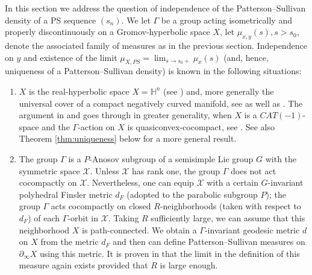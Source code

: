 \documentclass[12pt]{amsbook}%
\theoremstyle{definition}
\theoremstyle{remark}
\numberwithin{section}{chapter}
\numberwithin{subsection}{section}
\numberwithin{figure}{chapter}
\def\bH{{\mathbb{H}}}
\def\cX{{\mathscr{X}}}
\def\Ga{\Gamma}
\def\geo{\partial_\infty}
\begin{document}
{{In this section we address the question of independence of the Patterson--Sullivan density  of a PS sequence $(s_n)$. 
We let $\Ga$ be a group acting isometrically and properly discontinuously on a Gromov-hyperbolic space $X$, let $\mu_{x,y}(s), s>s_0$, 
denote the associated family of measures as in the previous section. Independence on $y$ and 
existence of the limit $\mu_{X,PS}=\lim_{s\to s_0+} \mu_{x}(s)$ (and, hence, uniqueness of a Patterson--Sullivan density) 
is known in the following situations:

\begin{enumerate}

\item $X$ is the real-hyperbolic space $X=\bH^n$ (see \cite{nicholls}) and, more generally  the  universal cover of a compact negatively curved manifold, see \cite{Yue} as well as \cite{quint_note}. The argument in \cite{Yue} and \cite{quint_note} goes through in greater generality, when $X$ is a $CAT(-1)$-space and the $\Ga$-action on $X$ is quasiconvex-cocom\-pact, see \cite[Corollary 1.8]{Roblin}. See also Theorem \ref{thm:uniqueness} below for a more general result. 



\item The group $\Ga$ is a $P$-Anosov subgroup of a semisimple Lie group $G$ with the symmetric space $\cX$. Unless $\cX$ has rank one, the group $\Ga$ does not act cocompactly on $\cX$. Nevertheless, one can equip $\cX$ with a certain $G$-invariant polyhedral Finsler metric $d_F$ (adopted to the parabolic subgroup $P$); the group $\Ga$ acts cocompactly on closed $R$-neighborhoods (taken with respect to $d_F$) of each $\Ga$-orbit in $\cX$.  Taking $R$ sufficiently large, we can assume that this neighborhood $X$ is path-connected. We obtain a $\Ga$-invariant geodesic metric $d$ on $X$ from the metric $d_F$ and then can define Patterson--Sullivan measures on $\geo X$ using this metric. It is proven in \cite{Dey-Kapovich} that the limit in the definition of this measure again exists provided that $R$ is large enough. 



\end{enumerate}}}
\end{document}

